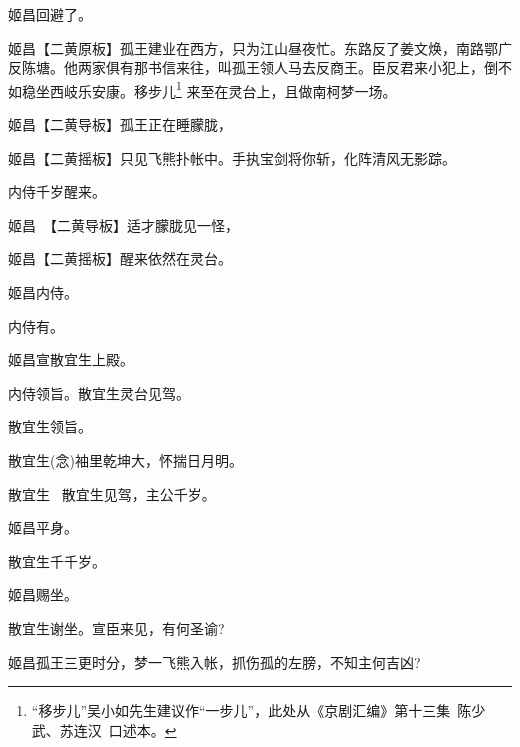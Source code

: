 {姬昌\hspace{30pt}回避了。

\setlength{\hangindent}{52pt}   %
{姬昌\hspace{30pt}【{\akai 二黄原板}】孤王建业在西方，只为江山昼夜忙。东路反了姜文焕，南路鄂广反陈塘。他两家俱有那书信来往，叫孤王领人马去反商王。臣反君来小犯上，倒不如稳坐西岐乐安康。移步儿\footnote{``移步儿''吴小如先生建议作``一步儿''，此处从《京剧汇编》第十三集~陈少武、苏连汉~口述本。}%
来至在灵台上，且做南柯梦一场。}

姬昌\hspace{30pt}【{\akai 二黄导板}】孤王正在睡朦胧，

	姬昌\hspace{30pt}【{\akai 二黄摇板}】只见飞熊扑帐中。手执宝剑将你斩，化阵清风无影踪。

内侍\hspace{30pt}千岁醒来。

姬昌\hspace{30pt}~【{\akai 二黄导板}】适才朦胧见一怪，

	姬昌\hspace{30pt}【{\akai 二黄摇板}】醒来依然在灵台。

姬昌\hspace{30pt}内侍。

内侍\hspace{30pt}有。

姬昌\hspace{30pt}宣散宜生上殿。

内侍\hspace{30pt}领旨。散宜生灵台见驾。

散宜生\hspace{20pt}领旨。

散宜生\hspace{20pt}({\akai 念})袖里乾坤大，怀揣日月明。

散宜生 \hspace{20pt}~散宜生见驾，主公千岁。

姬昌\hspace{30pt}平身。

散宜生\hspace{20pt}千千岁。

姬昌\hspace{30pt}赐坐。

散宜生\hspace{20pt}谢坐。宣臣来见，有何圣谕?

姬昌\hspace{30pt}孤王三更时分，梦一飞熊入帐，抓伤孤的左膀，不知主何吉凶?

}
